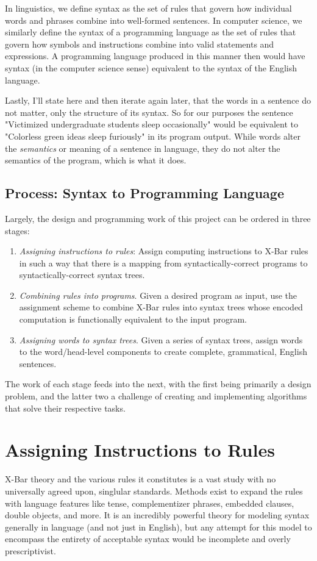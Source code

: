 \documentclass[runningheads]{llncs}
\begin{document}
In linguistics, we define syntax as the set of rules that govern how individual words and phrases combine into well-formed sentences. In computer science, we similarly define the syntax of a programming language as the set of rules that govern how symbols and instructions combine into valid statements and expressions. A programming language produced in this manner then would have syntax (in the computer science sense) equivalent to the syntax of the English language.

Lastly, I'll state here and then iterate again later, that the words in a sentence do not matter, only the structure of its syntax. So for our purposes the sentence "Victimized undergraduate students sleep occasionally" would be equivalent to "Colorless green ideas sleep furiously" in its program output. While words alter the \textit{semantics} or meaning of a sentence in language, they do not alter the semantics of the program, which is what it does.

\subsection{Process: Syntax to Programming Language}
Largely, the design and programming work of this project can be ordered in three stages:
\begin{enumerate}
	\item \textit{Assigning instructions to rules}: Assign computing instructions to X-Bar rules in such a way that there is a mapping from syntactically-correct programs to syntactically-correct syntax trees.
	\item \textit{Combining rules into programs}. Given a desired program as input, use the assignment scheme to combine X-Bar rules into syntax trees whose encoded computation is functionally equivalent to the input program.
	\item \textit{Assigning words to syntax trees}. Given a series of syntax trees, assign words to the word/head-level components to create complete, grammatical, English sentences.
\end{enumerate}
The work of each stage feeds into the next, with the first being primarily a design problem, and the latter two a challenge of creating and implementing algorithms that solve their respective tasks.

\section{Assigning Instructions to Rules}
X-Bar theory and the various rules it constitutes is a vast study with no universally agreed upon, singlular standards. Methods exist to expand the rules with language features like tense, complementizer phrases, embedded clauses, double objects, and more. \cite{hoekstra1991} \cite{carnie2006}
It is an incredibly powerful theory for modeling syntax generally in language (and not just in English), but any attempt for this model to encompass the entirety of acceptable syntax would be incomplete and overly prescriptivist.
\end{document}
